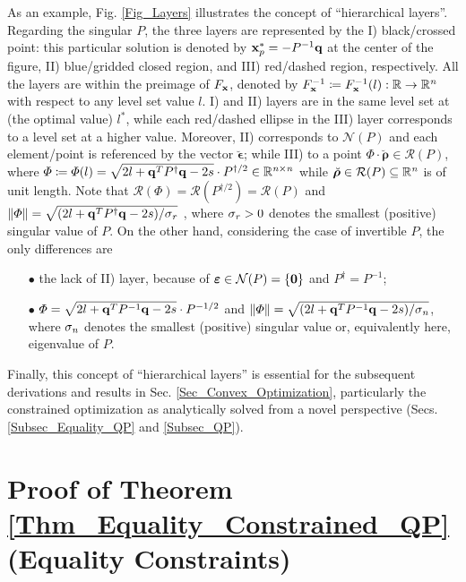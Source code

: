 \documentclass{imaman}
\newcommand{\bfx}{{\bf x}}
\newcommand{\bfq}{{\bf q}}
\newcommand{\bfepsilon}{{\boldsymbol \epsilon}}
\newcommand{\bfrho}{{\boldsymbol \rho}}
\newcommand{\bfvarepsilon}{{\boldsymbol \varepsilon}}
\newcommand{\bfzero}{{\bf 0}}
\newcommand{\real}{\mathbb{R}}
\newcommand{\calN}{{\mathcal N}}
\newcommand{\calR}{{\mathcal R}}
\newcommand{\itn}{{\it n}}
\newcommand{\itr}{{\it r}}
\numberwithin{equation}{section}
\begin{document}
\begin{remark}
As an example, Fig. \ref{Fig_Layers} illustrates the concept of ``hierarchical layers''. Regarding the singular $P$, the three layers are represented by the I) black/crossed point: this particular solution is denoted by $\bfx_p^*=-P^{-1}\bfq$ at the center of the figure, II) blue/gridded closed region, and III) red/dashed region, respectively. All the layers are within the preimage of $F_\bfx$, denoted by $F_\bfx^{-1}\coloneqq F_\bfx^{-1}(l):\real\rightarrow\real^\itn$ with respect to any level set value $l$. I) and II) layers are in the same level set at (the optimal value) $l^*$, while each red/dashed ellipse in the III) layer corresponds to a level set at a higher value. Moreover, II) corresponds to $\calN(P)$ and each element/point is referenced by the vector $\breve\bfepsilon$; while III) to a point $\Phi\cdot\breve\bfrho\in\calR(P)$, where $\Phi\coloneqq\Phi(l)=\sqrt{2l+\bfq^TP^\dagger\bfq-2s}\cdot P^{\dagger/2}\in\real^{\itn\times\itn}$ while $\breve\bfrho\in\calR(P)\subseteq\real^\itn$ is of unit length. Note that $\calR(\Phi)=\calR(P^{\dagger/2})=\calR(P)$ and $\Vert\Phi\Vert=\sqrt{(2l+\bfq^TP^\dagger\bfq-2s)/\sigma_\itr}$ \cite{GoVa:13}, where $\sigma_\itr>0$ denotes the smallest (positive) singular value of $P$. On the other hand, considering the case of invertible $P$, the only differences are
\begin{enumerate}
\item[$\bullet$] the lack of II) layer, because of $\bfvarepsilon\in\calN(P)=\{\bfzero\}$ and $P^\dagger=P^{-1}$;
\item[$\bullet$] $\Phi=\sqrt{2l+\bfq^TP^{-1}\bfq-2s}\cdot P^{-1/2}$ and $\Vert\Phi\Vert=\sqrt{(2l+\bfq^TP^{-1}\bfq-2s)/\sigma_\itn}$, where $\sigma_\itn$ denotes the smallest (positive) singular value or, equivalently here, eigenvalue of $P$.
\end{enumerate}
Finally, this concept of ``hierarchical layers'' is essential for the subsequent derivations and results in Sec. \ref{Sec_Convex_Optimization}, particularly the constrained optimization as analytically solved from a novel perspective (Secs. \ref{Subsec_Equality_QP} and \ref{Subsec_QP}).
\label{Rem_Fig_Geometric_Layers}
\end{remark}

\section{Proof of Theorem \ref{Thm_Equality_Constrained_QP} (Equality Constraints)}
\label{App_Proof_Equality_Constrained_QP}
\end{document}
